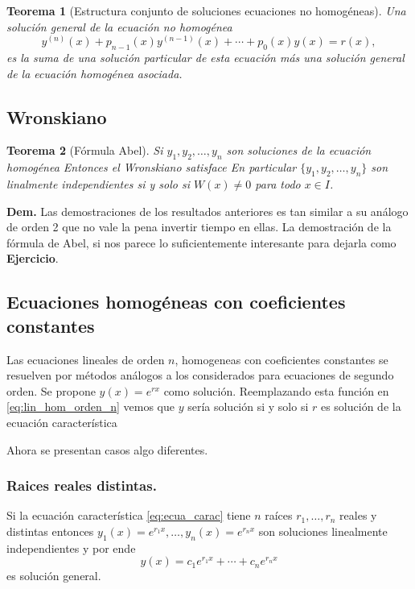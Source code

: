 \documentclass{article}
\newtheorem{teorema}{Teorema}[section]
\begin{document}
\begin{teorema}[Estructura conjunto de soluciones ecuaciones no homogéneas]
Una solución general de la ecuación no homogénea  
\[y^{(n)}(x)+p_{n-1}(x)y^{(n-1)}(x)+\cdots+p_0(x)y(x)=r(x),\]
es la suma de una solución particular de esta ecuación más una solución general de la ecuación homogénea asociada.
\end{teorema}






\subsection{Wronskiano}
\begin{teorema}[Fórmula Abel]
Si $y_1,y_2,\ldots,y_n$ son soluciones de la ecuación  homogénea  
Entonces el Wronskiano satisface
En particular  $\{y_1,y_2,\ldots,y_n\}$ son linalmente independientes si y solo si $W(x)\neq 0$ para todo $x\in I$.
\end{teorema}


\textbf{Dem.} Las demostraciones de los resultados anteriores es tan similar a su análogo de orden 2 que no vale la pena invertir tiempo en ellas. La demostración de la fórmula de Abel, si nos parece lo suficientemente interesante para dejarla como \textbf{Ejercicio}.



\subsection{Ecuaciones homogéneas con coeficientes constantes}
Las ecuaciones lineales de orden $n$, homogeneas con coeficientes constantes  se resuelven por métodos análogos a los considerados para ecuaciones de segundo orden. Se propone $y(x)=e^{rx}$ como solución. Reemplazando esta función
en \eqref{eq:lin_hom_orden_n} vemos que $y$ sería solución si y solo si $r$ es solución de la ecuación característica
 
Ahora se presentan casos algo diferentes.

\subsubsection{Raices reales distintas.}\label{pag:oper1}
Si la ecuación característica \eqref{eq:ecua_carac} tiene $n$ raíces $r_1,\ldots,r_n$ reales y distintas entonces 
$y_1(x)=e^{r_1x},\ldots,y_n(x)=e^{r_nx}$ son soluciones linealmente independientes y por ende
\[\boxed{y(x)=c_1e^{r_1x}+\cdots+c_ne^{r_nx}}\]
es solución general. 
\end{document}
